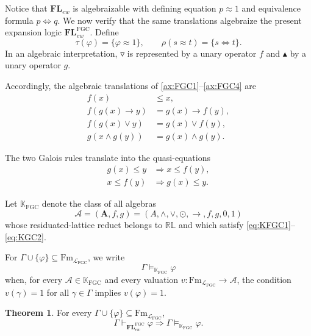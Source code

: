 \documentclass[final,12pt,times]{elsarticle}
\theoremstyle{plain}
\theoremstyle{definition}
\newtheorem{theorem}[definition]{Theorem}
\theoremstyle{break}
\begin{document}
Notice that $\mathbf{FL}_{ew}$ is algebraizable with defining equation
$p\approx1$ and equivalence formula $p\Leftrightarrow q$.  We now verify that
the same translations algebraize the present expansion logic $\mathbf{FL}^{\mathrm{FGC}}_{ew}$.  Define
\begin{equation}
 \tau(\varphi)=\{\varphi\approx1\},
 \qquad
 \rho(s\approx t)=\{s\Leftrightarrow t\}.
 \label{eq:algebraizing-translations}
\end{equation}
In an algebraic interpretation, $\triangledown$ is represented by a unary
operator $f$ and $\blacktriangle$ by a unary operator $g$. 

 Accordingly, the
algebraic translations of \eqref{ax:FGC1}--\eqref{ax:FGC4} are
\begin{align}
 f(x)&\le x,
   \label{eq:KFGC1}\\
 f(g(x)\to y)&=g(x)\to f(y),
   \label{eq:KFGC2}\\
 f(g(x)\vee y)&=g(x)\vee f(y),
   \label{eq:KFGC3}\\
 g(x\wedge g(y))&=g(x)\wedge g(y).
   \label{eq:KFGC4}
\end{align}

The two Galois rules translate into the quasi-equations
\begin{align}
 g(x)\le y&\Longrightarrow x\le f(y),
   \label{eq:KGC1}\\
 x\le f(y)&\Longrightarrow g(x)\le y.
   \label{eq:KGC2}
\end{align}

Let $\mathbb K_{\mathrm{FGC}}$ denote the class of all algebras
\[
 \mathscr{A}=(\mathbf{A},f,g)=(A,\wedge,\vee,\odot,\to,f,g,0,1)
\]
whose residuated-lattice reduct belongs to $\mathbb{RL}$ and which satisfy
\eqref{eq:KFGC1}--\eqref{eq:KGC2}.  

For
$\Gamma\cup\{\varphi\}\subseteq
\mathrm{Fm}_{\mathcal L_{\mathrm{FGC}}}$, we write
\[
 \Gamma\models_{\mathbb K_{\mathrm{FGC}}}\varphi
\]
when, for every $\mathscr{A}\in\mathbb K_{\mathrm{FGC}}$ and every valuation
$v:\mathrm{Fm}_{\mathcal L_{\mathrm{FGC}}}\to\mathscr{A}$, the condition
$v(\gamma)=1$ for all $\gamma\in\Gamma$ implies $v(\varphi)=1$.

\begin{theorem}\label{thm:FGC-soundness}
For every $\Gamma\cup\{\varphi\}\subseteq
\mathrm{Fm}_{\mathcal L_{\mathrm{FGC}}}$,
\[
 \Gamma\vdash_{\mathbf{FL}^{\mathrm{FGC}}_{ew}}\varphi
 \Longrightarrow
 \Gamma\models_{\mathbb K_{\mathrm{FGC}}}\varphi.
\]
\end{theorem}
\end{document}

